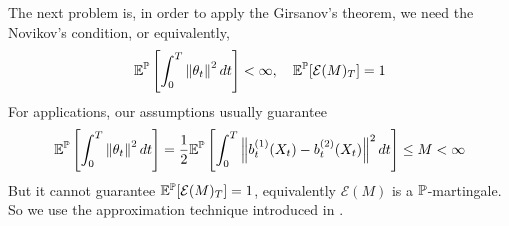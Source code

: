 \documentclass[a4paper,12pt]{article}
\begin{document}
\begin{enumerate}[label=(\arabic*)]
  \begin{rmk}
    The next problem is, in order to apply the Girsanov's theorem, we need the Novikov’s condition, or equivalently,
    \begin{equation*}
      \mathbb{E}^{\mathbb{P}}\left[\int_0^T\left\lVert\theta_t\right\lVert^2dt\right] < \infty ,\quad\mathbb{E}^{\mathbb{P}}[\mathcal{E}(M)_T] = 1
    \end{equation*}
    For applications, our assumptions usually guarantee
    \begin{equation*}
      \mathbb{E}^{\mathbb{P}}\left[\int_0^T\left\lVert\theta_t\right\lVert^2dt\right] = \frac{1}{2}\mathbb{E}^{\mathbb{P}}\left[\int_0^T\left\lVert b_t^{(1)}(X_t)-b_t^{(2)}(X_t)\right\lVert^2dt\right]\leq M < \infty
    \end{equation*}
    But it cannot guarantee $\mathbb{E}^{\mathbb{P}}[\mathcal{E}(M)_T] = 1$, equivalently $\mathcal{E}(M)$ is a $\mathbb{P}$-martingale. So we use the approximation technique introduced in \cite{chen2023sampling}. 


\end{rmk}
\end{enumerate}
\end{document}
